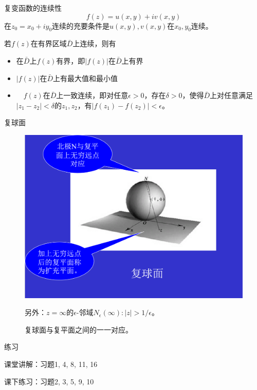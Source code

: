 \documentclass[11pt]{beamer}
\newcommand{\kong}[1][0.5]{\vspace{#1cm}}
\begin{document}
\begin{frame}{复变函数的连续性}
\begin{equation}
f(z) = u(x,y) + iv(x,y)
\end{equation}
在$z_0 = x_0 + i y_0$连续的充要条件是$u(x,y), v(x,y)$在$x_0, y_0$连续。

\kong[0.5]
若$f(z)$在有界区域$\bar{D}$上连续，则有
\begin{itemize}
	\item 在$\bar{D}$上$f(z)$有界，即$|f(z)|$在$\bar{D}$上有界
	\item $|f(z)|$在$\bar{D}$上有最大值和最小值
	\item　$f(z)$在$\bar{D}$上一致连续，即对任意$\epsilon>0$，存在$\delta>0$，使得$\bar{D}$上对任意满足$|z_1 - z_2|<\delta$的$z_1,z_2$，有$|f(z_1)-f(z_2)|<\epsilon$。
\end{itemize}
\end{frame}

\begin{frame}{复球面}
\begin{figure}
	\centering
	\includegraphics[width=0.6\linewidth]{chap1_08}
	\caption{复球面与复平面之间的一一对应。}
	\label{fig:chap108}
	
	另外：$z=\infty$的$\epsilon$-邻域$N_\epsilon(\infty): |z| > 1/ \epsilon $。
\end{figure}

\end{frame}

\begin{frame}{练习}
\kong[0.5]

课堂讲解：习题1, 4, 8, 11, 16

\kong[0.5]

课下练习：习题2, 3, 5, 9, 10
\end{frame}
\end{document}
